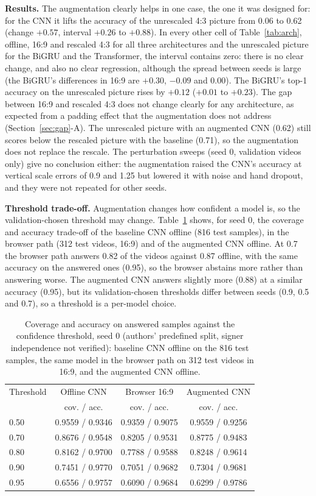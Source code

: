 \documentclass[conference]{IEEEtran}
\begin{document}
\textbf{Results.} The augmentation clearly helps in one case, the one it was designed for: for the CNN it lifts the accuracy of the unrescaled 4:3 picture from 0.06 to 0.62 (change $+0.57$, interval $+0.26$ to $+0.88$). In every other cell of Table~\ref{tab:arch}, offline, 16:9 and rescaled 4:3 for all three architectures and the unrescaled picture for the BiGRU and the Transformer, the interval contains zero: there is no clear change, and also no clear regression, although the spread between seeds is large (the BiGRU's differences in 16:9 are $+0.30$, $-0.09$ and $0.00$). The BiGRU's top-1 accuracy on the unrescaled picture rises by $+0.12$ ($+0.01$ to $+0.23$). The gap between 16:9 and rescaled 4:3 does not change clearly for any architecture, as expected from a padding effect that the augmentation does not address (Section~\ref{sec:gap}-A). The unrescaled picture with an augmented CNN (0.62) still scores below the rescaled picture with the baseline (0.71), so the augmentation does not replace the rescale. The perturbation sweeps (seed 0, validation videos only) give no conclusion either: the augmentation raised the CNN's accuracy at vertical scale errors of 0.9 and 1.25 but lowered it with noise and hand dropout, and they were not repeated for other seeds.

\textbf{Threshold trade-off.} Augmentation changes how confident a model is, so the validation-chosen threshold may change. Table~\ref{tab:trade} shows, for seed 0, the coverage and accuracy trade-off of the baseline CNN offline (816 test samples), in the browser path (312 test videos, 16:9) and of the augmented CNN offline. At 0.7 the browser path answers 0.82 of the videos against 0.87 offline, with the same accuracy on the answered ones (0.95), so the browser abstains more rather than answering worse. The augmented CNN answers slightly more (0.88) at a similar accuracy (0.95), but its validation-chosen thresholds differ between seeds (0.9, 0.5 and 0.7), so a threshold is a per-model choice.

\begin{table}[t]
\caption{Coverage and accuracy on answered samples against the confidence threshold, seed 0 (authors' predefined split, signer independence not verified): baseline CNN offline on the 816 test samples, the same model in the browser path on 312 test videos in 16:9, and the augmented CNN offline.}
\label{tab:trade}
\centering
\small
\setlength{\tabcolsep}{3pt}
\begin{tabular}{lccc}
\hline
Threshold & Offline CNN & Browser 16:9 & Augmented CNN\\
 & cov. / acc. & cov. / acc. & cov. / acc.\\
\hline
0.50 & 0.9559 / 0.9346 & 0.9359 / 0.9075 & 0.9559 / 0.9256\\
0.70 & 0.8676 / 0.9548 & 0.8205 / 0.9531 & 0.8775 / 0.9483\\
0.80 & 0.8162 / 0.9700 & 0.7788 / 0.9588 & 0.8248 / 0.9614\\
0.90 & 0.7451 / 0.9770 & 0.7051 / 0.9682 & 0.7304 / 0.9681\\
0.95 & 0.6556 / 0.9757 & 0.6090 / 0.9684 & 0.6299 / 0.9786\\
\hline
\end{tabular}
\end{table}
\end{document}
